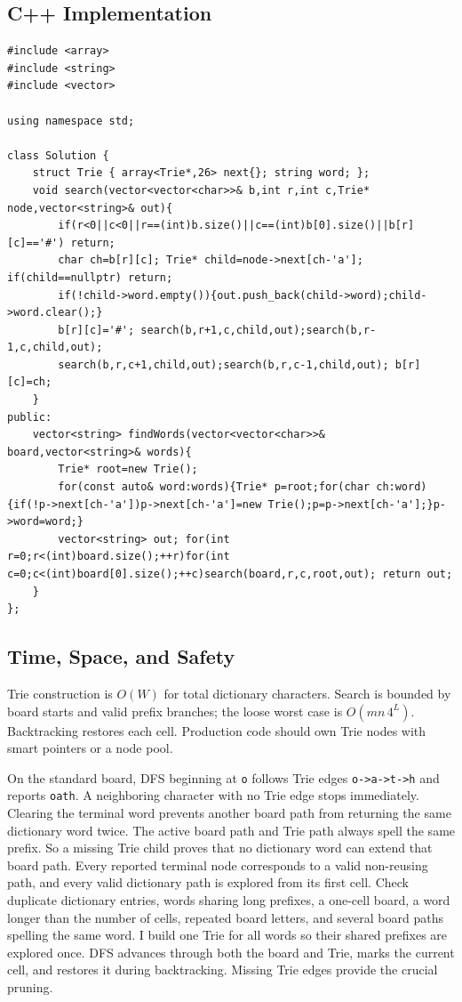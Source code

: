 \subsection{C++ Implementation}
\begin{lstlisting}[style=compactcode,caption={Complete C++ solution: Word Search II}]
#include <array>
#include <string>
#include <vector>

using namespace std;

class Solution {
    struct Trie { array<Trie*,26> next{}; string word; };
    void search(vector<vector<char>>& b,int r,int c,Trie* node,vector<string>& out){
        if(r<0||c<0||r==(int)b.size()||c==(int)b[0].size()||b[r][c]=='#') return;
        char ch=b[r][c]; Trie* child=node->next[ch-'a']; if(child==nullptr) return;
        if(!child->word.empty()){out.push_back(child->word);child->word.clear();}
        b[r][c]='#'; search(b,r+1,c,child,out);search(b,r-1,c,child,out);
        search(b,r,c+1,child,out);search(b,r,c-1,child,out); b[r][c]=ch;
    }
public:
    vector<string> findWords(vector<vector<char>>& board,vector<string>& words){
        Trie* root=new Trie();
        for(const auto& word:words){Trie* p=root;for(char ch:word){if(!p->next[ch-'a'])p->next[ch-'a']=new Trie();p=p->next[ch-'a'];}p->word=word;}
        vector<string> out; for(int r=0;r<(int)board.size();++r)for(int c=0;c<(int)board[0].size();++c)search(board,r,c,root,out); return out;
    }
};
\end{lstlisting}

\subsection{Time, Space, and Safety}
Trie construction is \(O(W)\) for total dictionary characters. Search is
bounded by board starts and valid prefix branches; the loose worst case is
\(O(mn\,4^L)\). Backtracking restores each cell. Production code should own
Trie nodes with smart pointers or a node pool.

\lessonexpansion
  {On the standard board, DFS beginning at \texttt{o} follows Trie edges
   \texttt{o->a->t->h} and reports \texttt{oath}. A neighboring character with
   no Trie edge stops immediately. Clearing the terminal word prevents another
   board path from returning the same dictionary word twice.}
  {The active board path and Trie path always spell the same prefix. So
   a missing Trie child proves that no dictionary word can extend that board
   path. Every reported terminal node corresponds to a valid non-reusing path,
   and every valid dictionary path is explored from its first cell.}
  {Check duplicate dictionary entries, words sharing long prefixes, a one-cell
   board, a word longer than the number of cells, repeated board letters, and
   several board paths spelling the same word.}
  {I build one Trie for all words so their shared prefixes are explored once.
   DFS advances through both the board and Trie, marks the current cell, and
   restores it during backtracking. Missing Trie edges provide the crucial
   pruning.}


